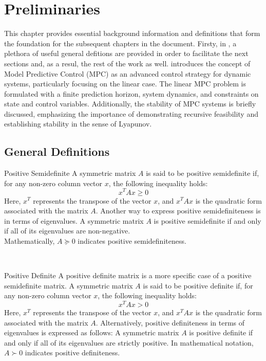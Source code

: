 \chapter{Preliminaries}\label{ch:preliminaries}
This chapter provides essential background information and definitions that form the foundation for the subsequent chapters in the document. Firsty, in , a plethora of useful general defitions are provided in order to facilitate the next sections and, as a resul, the rest of the work as well. 
 introduces the concept of Model Predictive Control (MPC) as an advanced control strategy for dynamic systems, particularly focusing on the linear case. The linear MPC problem is formulated with a finite prediction horizon, system dynamics, and constraints on state and control variables. Additionally, the stability of MPC systems is briefly discussed, emphasizing the importance of demonstrating recursive feasibility and establishing stability in the sense of Lyapunov. 

\section{General Definitions}\label{sec:general_definitions}
\begin{definition}{Positive Semidefinite}
	A symmetric matrix $A$ is said to be positive semidefinite if, for any non-zero column vector $x$, the following inequality holds:
	\begin{equation}
		x^T Ax \geq 0
	\end{equation}
	Here, $x^T$ represents the transpose of the vector $x$, and $x^T Ax$ is the quadratic form associated with the matrix $A$. Another way to express positive semidefiniteness is in terms of eigenvalues. A symmetric matrix $A$ is positive semidefinite if and only if all of its eigenvalues are non-negative.\\
	Mathematically, $A \succeq 0 $ indicates positive semidefiniteness.
\end{definition}\\



\begin{definition}{Positive Definite}
	A positive definite matrix is a more specific case of a positive semidefinite matrix. A symmetric matrix $A$ is said to be positive definite if, for any non-zero column vector $x$, the following inequality holds:
	\begin{equation}
		x^T Ax > 0
	\end{equation}
	Here, $x^T$ represents the transpose of the vector $x$, and $x^T Ax$ is the quadratic form associated with the matrix $A$. Alternatively, positive definiteness in terms of eigenvalues is expressed as follows: A symmetric matrix $A$ is positive definite if and only if all of its eigenvalues are strictly positive.
	In mathematical notation, $A \succ 0$ indicates positive definiteness.
\end{definition}\\



